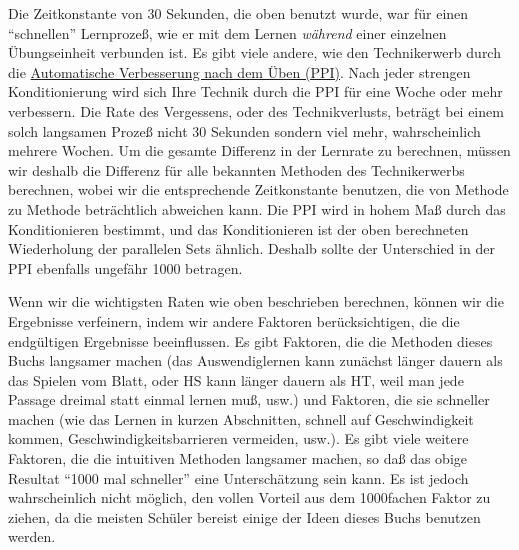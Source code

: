 Die Zeitkonstante von 30 Sekunden, die oben benutzt wurde, war für einen \enquote{schnellen} Lernprozeß, wie er mit dem Lernen \textit{während} einer einzelnen Übungseinheit verbunden ist.
Es gibt viele andere, wie den Technikerwerb durch die \hyperlink{c1ii15}{Automatische Verbesserung nach dem Üben (PPI)}.
Nach jeder strengen Konditionierung wird sich Ihre Technik durch die PPI für eine Woche oder mehr verbessern.
Die Rate des Vergessens, oder des Technikverlusts, beträgt bei einem solch langsamen Prozeß nicht 30 Sekunden sondern viel mehr, wahrscheinlich mehrere Wochen.
Um die gesamte Differenz in der Lernrate zu berechnen, müssen wir deshalb die Differenz für alle bekannten Methoden des Technikerwerbs berechnen, wobei wir die entsprechende Zeitkonstante benutzen, die von Methode zu Methode beträchtlich abweichen kann.
Die PPI wird in hohem Maß durch das Konditionieren bestimmt, und das Konditionieren ist der oben berechneten Wiederholung der parallelen Sets ähnlich.
Deshalb sollte der Unterschied in der PPI ebenfalls ungefähr 1000 betragen.

Wenn wir die wichtigsten Raten wie oben beschrieben berechnen, können wir die Ergebnisse verfeinern, indem wir andere Faktoren berücksichtigen, die die endgültigen Ergebnisse beeinflussen.
Es gibt Faktoren, die die Methoden dieses Buchs langsamer machen (das Auswendiglernen kann zunächst länger dauern als das Spielen vom Blatt, oder HS kann länger dauern als HT, weil man jede Passage dreimal statt einmal lernen muß, usw.) und Faktoren, die sie schneller machen (wie das Lernen in kurzen Abschnitten, schnell auf Geschwindigkeit kommen, Geschwindigkeitsbarrieren vermeiden, usw.).
Es gibt viele weitere Faktoren, die die intuitiven Methoden langsamer machen, so daß das obige Resultat \enquote{1000 mal schneller} eine Unterschätzung sein kann.
Es ist jedoch wahrscheinlich nicht möglich, den vollen Vorteil aus dem 1000fachen Faktor zu ziehen, da die meisten Schüler bereist einige der Ideen dieses Buchs benutzen werden.

